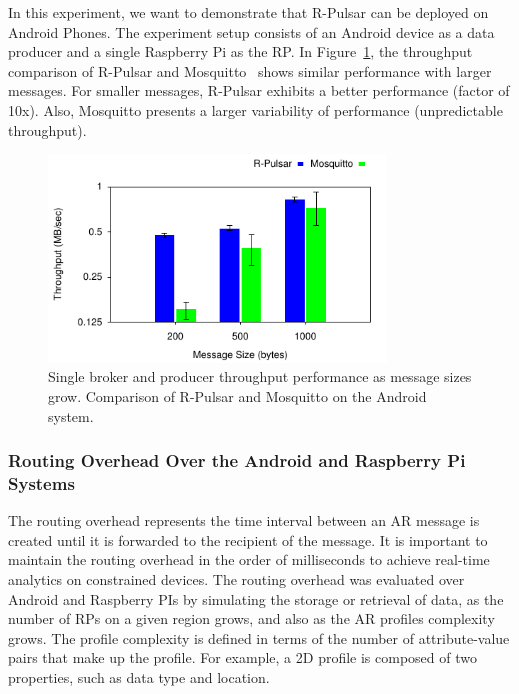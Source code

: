 In this experiment, we want to demonstrate that R-Pulsar can be deployed on  Android Phones.  
The experiment setup consists of an Android device as a data producer and a single Raspberry Pi as the RP.
In Figure~\ref{fig:ProducerPhone}, the throughput comparison of R-Pulsar and Mosquitto~\cite{mosquitto} shows similar performance with larger messages. For smaller messages, R-Pulsar exhibits a better performance (factor of 10x). Also, Mosquitto presents a larger variability of performance (unpredictable throughput).

\begin{figure}[h!]
  \includegraphics[width=0.8\textwidth]{Results/ProducerPhone}
  \caption{Single broker and producer throughput performance as message sizes grow. Comparison of R-Pulsar and Mosquitto on the Android system.}
  \label{fig:ProducerPhone}

\end{figure}

\vspace{1ex}
\subsubsection{Routing Overhead Over the Android and Raspberry Pi Systems}
\hfill\vspace{1ex}

The routing overhead represents the time interval between an AR message is created until it is forwarded to the recipient of the message. It is important to maintain the routing overhead in the order of milliseconds to achieve real-time analytics on constrained devices.
The routing overhead was evaluated over Android and Raspberry PIs by simulating the storage or retrieval of data, as the number of RPs on a given region grows, and also as the AR profiles complexity grows. The profile complexity is defined in terms of the number of attribute-value pairs that make up the profile. For example, a 2D profile is composed of two properties, such as data type and location.

